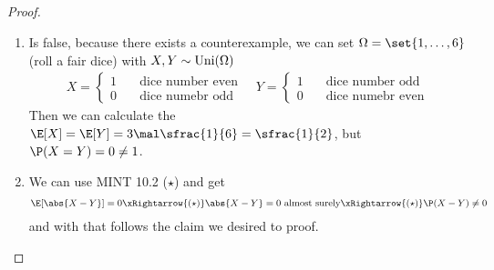 \subsection{}
\begin{proof}\
	\begin{enumerate}
		\item Is false, because there exists a counterexample, we can set $\Omega = \set{1,\dots,6}$ (roll a fair dice) with $X,Y \sim \operatorname{Uni}(\Omega)$
		\begin{align*}
			X = 
			\begin{cases}
				1 &\quad \text{dice number even}\\
				0 &\quad \text{dice numebr odd}
			\end{cases}
			\quad Y =
			\begin{cases}
				1 &\quad \text{dice number odd}\\
				0 &\quad \text{dice numebr even}
			\end{cases} 
		\end{align*}
		Then we can calculate the $\E[X] = \E[Y] =3\mal \sfrac{1}{6}= \sfrac{1}{2}$, but $\P(X=Y) = 0 \neq 1$.
		\item We can use MINT 10.2 ($\star$) and get
		\begin{align*}
			\E[\abs{X-Y}] = 0
			\xRightarrow{(\star)} \abs{X-Y} = 0 \text{ almost surely}
			\xRightarrow{(\star)} \P(X-Y)\neq 0 
		\end{align*}
		and with that follows the claim we desired to proof.
	\end{enumerate}
\end{proof}
